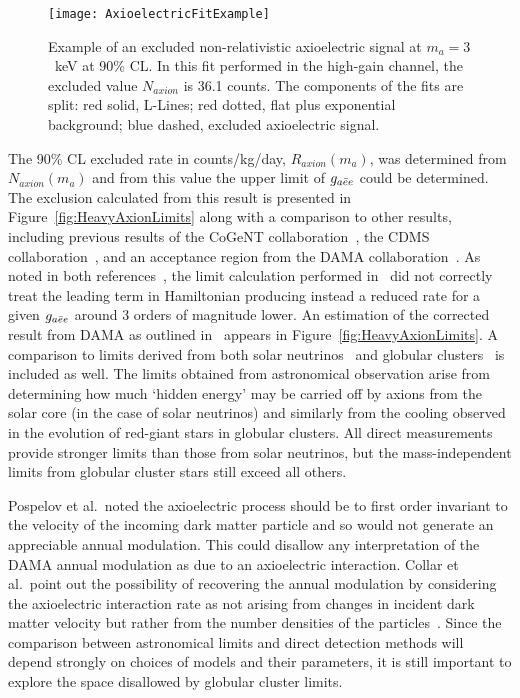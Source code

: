 		\begin{figure}
			\centering
			\texttt{[image: AxioelectricFitExample]}
			\caption[Example of an excluded non-relativistic axioelectric signal at $m_{a}=3$~keV at 
			90\% CL]{Example of an excluded non-relativistic axioelectric signal at $m_{a}=3$~keV at 
			90\% CL.  In this fit performed in the high-gain channel, the excluded value $N_{axion}$ 
			is 36.1 counts.  
			The components of the fits are split: red solid, L-Lines; red dotted, flat plus exponential
			background; blue dashed, excluded axioelectric signal.}
			\label{fig:ExampleHeavyAxionFit}
		\end{figure}
			
	The 90\% CL excluded rate in counts/kg/day, $R_{axion}(m_{a})$, was determined from $N_{axion}(m_{a})$ and from this value the upper limit of $g_{a\bar{e}e}$ could be determined.  The exclusion calculated from this result is presented in Figure~\ref{fig:HeavyAxionLimits} along with a comparison to other results, including previous results of the CoGeNT collaboration~\cite{Aalseth:2008aa}, the CDMS collaboration~\cite{Ahmed2009}, and an acceptance region from the DAMA collaboration~\cite{Bernabei:2005ca}.  As noted in both references~\cite{Collar:2009sp,Pospelov:2008jk}, the limit calculation performed in~\cite{Bernabei:2005ca} did not correctly treat the leading term in Hamiltonian producing instead a reduced rate for a given $g_{a\bar{e}e}$ around 3 orders of magnitude lower.  An estimation of the corrected result from DAMA as outlined in~\cite{Collar:2009sp} appears in Figure~\ref{fig:HeavyAxionLimits}.  A comparison to limits derived from both solar neutrinos~\cite{Gondolo09} and globular clusters~\cite{Raffelt95} is included as well.  The limits obtained from astronomical observation arise from determining how much `hidden energy' may be carried off by axions from the solar core (in the case of solar neutrinos) and similarly from the cooling observed in the evolution of red-giant stars in globular clusters.  All direct measurements provide stronger limits than those from solar neutrinos, but the mass-independent limits from globular cluster stars still exceed all others.  
			
	Pospelov et al.~noted the axioelectric process should be to first order invariant to the velocity of the incoming dark matter particle and so would not generate an appreciable annual modulation.  This could disallow any interpretation of the DAMA annual modulation as due to an axioelectric interaction.  Collar et al.~point out the possibility of recovering the annual modulation by considering the axioelectric interaction rate as not arising from changes in incident dark matter velocity but rather from the number densities of the particles~\cite{Collar:2009sp}.  Since the comparison between astronomical limits and direct detection methods will depend strongly on choices of models and their parameters, it is still important to explore the space disallowed by globular cluster limits.
			

